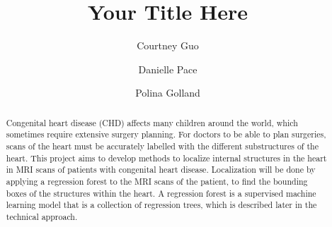 \documentclass[sigconf,12pt]{acmart}
\begin{document}
\title{Your Title Here}

\author{Courtney Guo}

\author{Danielle Pace}

\author{Polina Golland}


\begin{abstract}
\doublespacing
Congenital heart disease (CHD) affects many children around the world, which sometimes require extensive surgery planning. For doctors to be able to plan surgeries, scans of the heart must be accurately labelled with the different substructures of the heart. This project aims to develop methods to localize internal structures in the heart in MRI scans of patients with congenital heart disease. Localization will be done by applying a regression forest to the MRI scans of the patient, to find the bounding boxes of the structures within the heart. A regression forest is a supervised machine learning model that is a collection of regression trees, which is described later in the technical approach. %
\end{abstract}


\maketitle

\begin{doublespacing}



\end{doublespacing}



\end{document}

